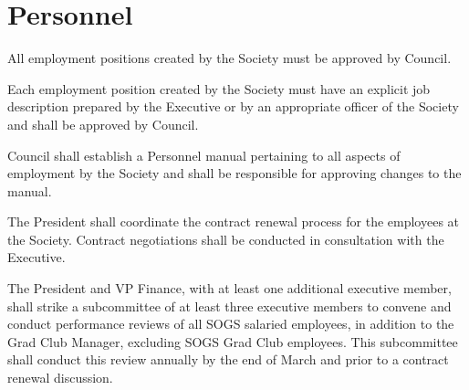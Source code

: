 \newpage
{}

\section{Personnel}

\begin{longenum}[ label*=\thesection.\arabic*., align=left]
	\item All employment positions created by the Society must be approved by Council.
    \item Each employment position created by the Society must have an explicit job description prepared by the Executive or by an appropriate officer of the Society and shall be approved by Council. 
    \item Council shall establish a Personnel manual pertaining to all aspects of employment by the Society and shall be responsible for approving changes to the manual.
    \item The President shall coordinate the contract renewal process for the employees at the Society. Contract negotiations shall be conducted in consultation with the Executive.
    \item The President and VP Finance, with at least one additional executive member, shall strike a subcommittee of at least three executive members to convene and conduct performance reviews of all SOGS salaried employees, in addition to the Grad Club Manager, excluding SOGS Grad Club employees. This subcommittee shall conduct this review annually by the end of March and prior to a contract renewal discussion.
\end{longenum}

\newpage

